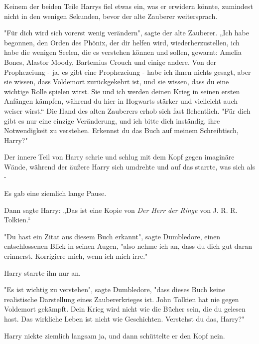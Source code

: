{Keinem der beiden Teile Harrys fiel etwas ein, was er erwidern könnte, zumindest nicht in den wenigen Sekunden, bevor der alte Zauberer weitersprach.

"Für dich wird sich vorerst wenig verändern", sagte der alte Zauberer. „Ich habe begonnen, den Orden des Phönix, der dir helfen wird, wiederherzustellen, ich habe die wenigen Seelen, die es verstehen können und sollen, gewarnt: Amelia Bones, Alastor Moody, Bartemius Crouch und einige andere. Von der Prophezeiung - ja, es gibt eine Prophezeiung - habe ich ihnen nichts gesagt, aber sie wissen, dass Voldemort zurückgekehrt ist, und sie wissen, dass du eine wichtige Rolle spielen wirst. Sie und ich werden deinen Krieg in seinen ersten Anfängen kämpfen, während du hier in Hogwarts stärker und vielleicht auch weiser wirst.“ Die Hand des alten Zauberers erhob sich fast flehentlich. "Für dich gibt es nur eine einzige Veränderung, und ich bitte dich inständig, ihre Notwendigkeit zu verstehen. Erkennst du das Buch auf meinem Schreibtisch, Harry?"

Der innere Teil von Harry schrie und schlug mit dem Kopf gegen imaginäre Wände, während der äußere Harry sich umdrehte und auf das starrte, was sich als -

Es gab eine ziemlich lange Pause.

Dann sagte Harry: „Das ist eine Kopie von \emph{Der Herr der Ringe} von J. R. R. Tolkien.“

"Du hast ein Zitat aus diesem Buch erkannt", sagte Dumbledore, einen entschlossenen Blick in seinen Augen, "also nehme ich an, dass du dich gut daran erinnerst. Korrigiere mich, wenn ich mich irre."

Harry starrte ihn nur an.

"Es ist wichtig zu verstehen", sagte Dumbledore, "dass dieses Buch keine realistische Darstellung eines Zaubererkrieges ist. John Tolkien hat nie gegen Voldemort gekämpft. Dein Krieg wird nicht wie die Bücher sein, die du gelesen hast. Das wirkliche Leben ist nicht wie Geschichten. Verstehst du das, Harry?"

Harry nickte ziemlich langsam ja, und dann schüttelte er den Kopf nein.

}
